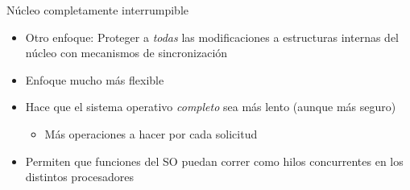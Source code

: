\documentclass[presentation]{beamer}
\begin{document}
\begin{frame}[label={sec:orgdc3fd5a}]{Núcleo completamente interrumpible}
\begin{itemize}
\item Otro enfoque: Proteger a \emph{todas} las modificaciones a estructuras
internas del núcleo con mecanismos de sincronización
\item Enfoque mucho más flexible
\item Hace que el sistema operativo \emph{completo} sea más lento (aunque más
seguro)
\begin{itemize}
\item Más operaciones a hacer por cada solicitud
\end{itemize}
\item Permiten que funciones del SO puedan correr como hilos concurrentes
en los distintos procesadores
\end{itemize}
\end{frame}
\end{document}
